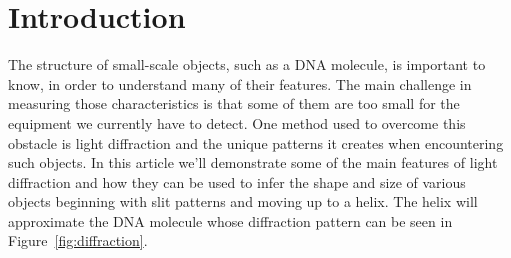 \section{Introduction}\label{sec:introduction}
The structure of small-scale objects, such as a DNA molecule, is important to know, in order to understand many of their features.
The main challenge in measuring those characteristics is that some of them are too small for the equipment we currently have to detect.
One method used to overcome this obstacle is light diffraction and the unique patterns it creates when encountering such objects.
In this article we'll demonstrate some of the main features of light diffraction and how they can be used to infer the shape and size of various objects beginning with slit patterns and moving up to a helix.
The helix will approximate the DNA molecule whose diffraction pattern can be seen in Figure~\ref{fig:diffraction}.





